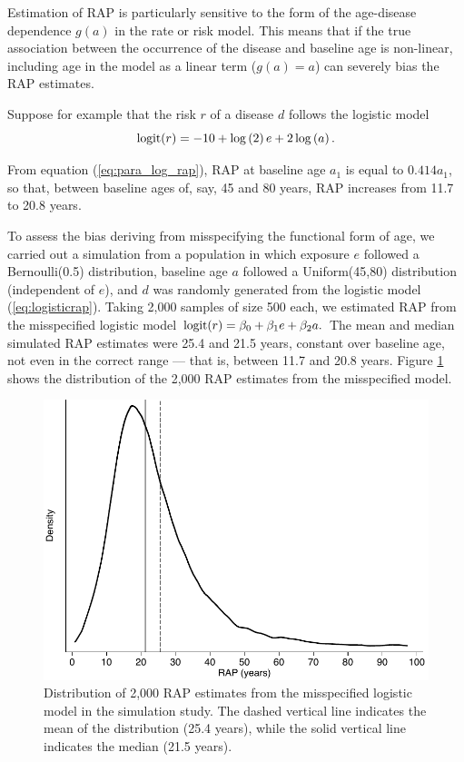 Estimation of RAP is particularly sensitive to the form of the age-disease dependence $g(a)$ in the rate or risk model. This means that if the true association between the occurrence of the disease and baseline age is non-linear, including age in the model as a linear term ($g(a)=a$) can severely bias the RAP estimates.

Suppose for example that the risk $r$ of a disease $d$ follows the logistic model
\begin{equation}
\operatorname{logit}(r)= -10 + \log\left(2\right)e + 2 \log\left(a\right).
\label{eq:logisticrap}
\end{equation}

From equation (\ref{eq:para_log_rap}), RAP at baseline age $a_1$ is equal to $0.414a_1$, so that, between baseline ages of, say, 45 and 80 years, RAP increases from 11.7 to 20.8 years.

To assess the bias deriving from misspecifying the functional form of age, we carried out a simulation from a population in which exposure $e$ followed a Bernoulli(0.5) distribution, baseline age $a$ followed a Uniform(45,80) distribution (independent of $e$), and $d$ was randomly generated from the logistic model (\ref{eq:logisticrap}). Taking 2,000 samples of size 500 each, we estimated RAP from the misspecified logistic model $\operatorname{logit}(r)= \beta_0 + \beta_1 e + \beta_2 a.$ The mean and median simulated RAP estimates were 25.4 and 21.5 years, constant over baseline age, not even in the correct range --- that is, between 11.7 and 20.8 years. Figure \ref{fig:rap_kd} shows the distribution of the 2,000 RAP estimates from the misspecified model. 

\begin{figure}[]
\centering
\includegraphics[width=.7\linewidth]{figures/rap_kd.pdf}
\caption[Distribution of biased RAP estimates due to model misspecification in a simulation study]{Distribution of 2,000 RAP estimates from the misspecified logistic model in the simulation study. The dashed vertical line indicates the mean of the distribution (25.4 years), while the solid vertical line indicates the median (21.5 years).}
\label{fig:rap_kd}
\end{figure}

